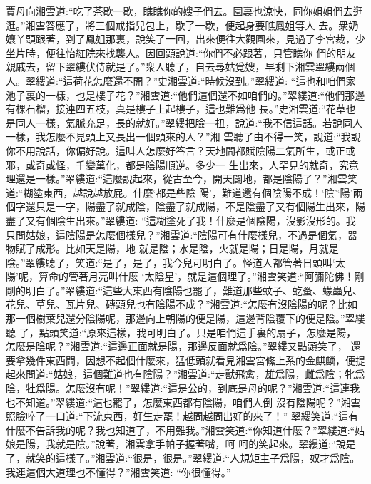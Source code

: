 \begin{parag}
    賈母向湘雲道:“吃了茶歇一歇，瞧瞧你的嫂子們去。園裏也涼快，同你姐姐們去逛逛。”湘雲答應了，將三個戒指兒包上，歇了一歇，便起身要瞧鳳姐等人 去。衆奶孃丫頭跟著，到了鳳姐那裏，說笑了一回，出來便往大觀園來，見過了李宮裁，少坐片時，便往怡紅院來找襲人。因回頭說道:“你們不必跟著，只管瞧你 們的朋友親戚去，留下翠縷伏侍就是了。”衆人聽了，自去尋姑覓嫂，早剩下湘雲翠縷兩個人。翠縷道:“這荷花怎麼還不開？”史湘雲道:“時候沒到。”翠縷道: “這也和咱們家池子裏的一樣，也是樓子花？”湘雲道:“他們這個還不如咱們的。”翠縷道:“他們那邊有棵石榴，接連四五枝，真是樓子上起樓子，這也難爲他 長。”史湘雲道:“花草也是同人一樣，氣脈充足，長的就好。”翠縷把臉一扭，說道:“我不信這話。若說同人一樣，我怎麼不見頭上又長出一個頭來的人？”湘 雲聽了由不得一笑，說道:“我說你不用說話，你偏好說。這叫人怎麼好答言？天地間都賦陰陽二氣所生，或正或邪，或奇或怪，千變萬化，都是陰陽順逆。多少一 生出來，人罕見的就奇，究竟理還是一樣。”翠縷道:“這麼說起來，從古至今，開天闢地，都是陰陽了？”湘雲笑道:“糊塗東西，越說越放屁。什麼‘都是些陰 陽’，難道還有個陰陽不成！‘陰’‘陽’兩個字還只是一字，陽盡了就成陰，陰盡了就成陽，不是陰盡了又有個陽生出來，陽盡了又有個陰生出來。”翠縷道: “這糊塗死了我！什麼是個陰陽，沒影沒形的。我只問姑娘，這陰陽是怎麼個樣兒？”湘雲道:“陰陽可有什麼樣兒，不過是個氣，器物賦了成形。比如天是陽，地 就是陰；水是陰，火就是陽；日是陽，月就是陰。”翠縷聽了，笑道:“是了，是了，我今兒可明白了。怪道人都管著日頭叫‘太陽’呢，算命的管著月亮叫什麼 ‘太陰星’，就是這個理了。”湘雲笑道:“阿彌陀佛！剛剛的明白了。”翠縷道:“這些大東西有陰陽也罷了，難道那些蚊子、虼蚤、蠓蟲兒、花兒、草兒、瓦片兒、磚頭兒也有陰陽不成？”湘雲道:“怎麼有沒陰陽的呢？比如那一個樹葉兒還分陰陽呢，那邊向上朝陽的便是陽，這邊背陰覆下的便是陰。”翠縷聽 了，點頭笑道:“原來這樣，我可明白了。只是咱們這手裏的扇子，怎麼是陽，怎麼是陰呢？”湘雲道:“這邊正面就是陽，那邊反面就爲陰。”翠縷又點頭笑了， 還要拿幾件東西問，因想不起個什麼來，猛低頭就看見湘雲宮絛上系的金麒麟，便提起來問道:“姑娘，這個難道也有陰陽？”湘雲道:“走獸飛禽，雄爲陽，雌爲陰；牝爲陰，牡爲陽。怎麼沒有呢！”翠縷道:“這是公的，到底是母的呢？”湘雲道:“這連我也不知道。”翠縷道:“這也罷了，怎麼東西都有陰陽，咱們人倒 沒有陰陽呢？”湘雲照臉啐了一口道:“下流東西，好生走罷！越問越問出好的來了！” 翠縷笑道:“這有什麼不告訴我的呢？我也知道了，不用難我。”湘雲笑道:“你知道什麼？”翠縷道:“姑娘是陽，我就是陰。”說著，湘雲拿手帕子握著嘴，呵 呵的笑起來。翠縷道:“說是了，就笑的這樣了。”湘雲道:“很是，很是。”翠縷道:“人規矩主子爲陽，奴才爲陰。我連這個大道理也不懂得？”湘雲笑道: “你很懂得。”
\end{parag}


